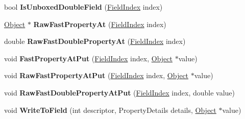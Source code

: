 \begin{DoxyCompactItemize}
\item 
bool {\bfseries Is\+Unboxed\+Double\+Field} (\hyperlink{classv8_1_1internal_1_1_field_index}{Field\+Index} index)\hypertarget{classv8_1_1internal_1_1_j_s_object_aca96ec4753d32f784faafb0a4d7e896d}{}\label{classv8_1_1internal_1_1_j_s_object_aca96ec4753d32f784faafb0a4d7e896d}

\item 
\hyperlink{classv8_1_1internal_1_1_object}{Object} $\ast$ {\bfseries Raw\+Fast\+Property\+At} (\hyperlink{classv8_1_1internal_1_1_field_index}{Field\+Index} index)\hypertarget{classv8_1_1internal_1_1_j_s_object_ae11828d659a1d8ce76a733b6e488a316}{}\label{classv8_1_1internal_1_1_j_s_object_ae11828d659a1d8ce76a733b6e488a316}

\item 
double {\bfseries Raw\+Fast\+Double\+Property\+At} (\hyperlink{classv8_1_1internal_1_1_field_index}{Field\+Index} index)\hypertarget{classv8_1_1internal_1_1_j_s_object_a361ae7a10b52d92210f7aad6c756f584}{}\label{classv8_1_1internal_1_1_j_s_object_a361ae7a10b52d92210f7aad6c756f584}

\item 
void {\bfseries Fast\+Property\+At\+Put} (\hyperlink{classv8_1_1internal_1_1_field_index}{Field\+Index} index, \hyperlink{classv8_1_1internal_1_1_object}{Object} $\ast$value)\hypertarget{classv8_1_1internal_1_1_j_s_object_a2a6776b07755bedb1322bb0c8623566f}{}\label{classv8_1_1internal_1_1_j_s_object_a2a6776b07755bedb1322bb0c8623566f}

\item 
void {\bfseries Raw\+Fast\+Property\+At\+Put} (\hyperlink{classv8_1_1internal_1_1_field_index}{Field\+Index} index, \hyperlink{classv8_1_1internal_1_1_object}{Object} $\ast$value)\hypertarget{classv8_1_1internal_1_1_j_s_object_a214c2d4e01a0f6cb2d3f390838d2746d}{}\label{classv8_1_1internal_1_1_j_s_object_a214c2d4e01a0f6cb2d3f390838d2746d}

\item 
void {\bfseries Raw\+Fast\+Double\+Property\+At\+Put} (\hyperlink{classv8_1_1internal_1_1_field_index}{Field\+Index} index, double value)\hypertarget{classv8_1_1internal_1_1_j_s_object_ab596c302257582bab3f3eb605aa46aca}{}\label{classv8_1_1internal_1_1_j_s_object_ab596c302257582bab3f3eb605aa46aca}

\item 
void {\bfseries Write\+To\+Field} (int descriptor, Property\+Details details, \hyperlink{classv8_1_1internal_1_1_object}{Object} $\ast$value)\hypertarget{classv8_1_1internal_1_1_j_s_object_a4db954302ef8fe567e8106eecb41b0d7}{}\label{classv8_1_1internal_1_1_j_s_object_a4db954302ef8fe567e8106eecb41b0d7}


\end{DoxyCompactItemize}
